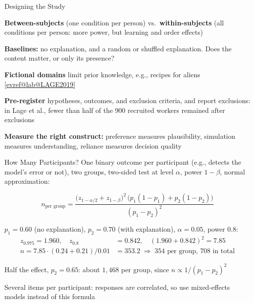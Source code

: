 \documentclass[10pt,compress,t,notes=noshow, xcolor=table]{beamer}
\makeatletter
\newcommand{\citeref}[1]{%
  \href{\csname evref@url@#1\endcsname}{[\csname evref@lab@#1\endcsname]}}
\makeatother
\begin{document}
\begin{framev}[align=mid]{Designing the Study}
\begin{itemizeM}
\item \textbf{Between-subjects} (one condition per person) vs.\ \textbf{within-subjects} (all conditions per person: more power, but learning and order effects)
\item \textbf{Baselines:} no explanation, and a random or shuffled explanation. Does the content matter, or only its presence?
\item \textbf{Fictional domains} limit prior knowledge, e.g., recipes for aliens \citeref{LAGE2019}
\item \textbf{Pre-register} hypotheses, outcomes, and exclusion criteria, and report exclusions: in Lage et al., fewer than half of the 900 recruited workers remained after exclusions
\item \textbf{Measure the right construct:} preference measures plausibility, simulation measures understanding, reliance measures decision quality
\end{itemizeM}
\end{framev}


\begin{framev}[align=mid]{How Many Participants?}
One binary outcome per participant (e.g., detects the model's error or not), two groups, two-sided test at level $\alpha$, power $1-\beta$, normal approximation:
\begin{definition}
\[n_{\text{per group}} = \frac{\big(z_{1-\alpha/2} + z_{1-\beta}\big)^2\,\big(p_1(1-p_1) + p_2(1-p_2)\big)}{(p_1 - p_2)^2}\]
\end{definition}
\begin{example}
$p_1 = 0.60$ (no explanation), $p_2 = 0.70$ (with explanation), $\alpha = 0.05$, power $0.8$:
\begin{align*}
z_{0.975} = 1.960, \quad z_{0.8} &= 0.842, \quad (1.960 + 0.842)^2 = 7.85\\
n = 7.85 \cdot (0.24 + 0.21)/0.01 &= 353.2 \;\Rightarrow\; 354 \text{ per group, } 708 \text{ in total}
\end{align*}
\end{example}
\pause
\begin{itemizeS}
\item Half the effect, $p_2 = 0.65$: about $1{,}468$ per group, since $n \propto 1/(p_1 - p_2)^2$
\item Several items per participant: responses are correlated, so use mixed-effects models instead of this formula
\end{itemizeS}
\end{framev}
\end{document}

